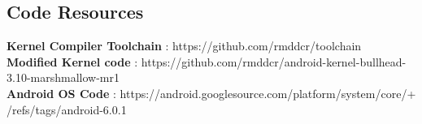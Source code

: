 \begin{appendices}
\chapter{Code Resources}
\label{app_one}

\textbf{Kernel Compiler Toolchain} : https://github.com/rmddcr/toolchain\\
\textbf{Modified Kernel code} : https://github.com/rmddcr/android-kernel-bullhead-3.10-marshmallow-mr1\\
\textbf{Android OS Code} : https://android.googlesource.com/platform/system/core/+\\/refs/tags/android-6.0.1

\end{appendices}